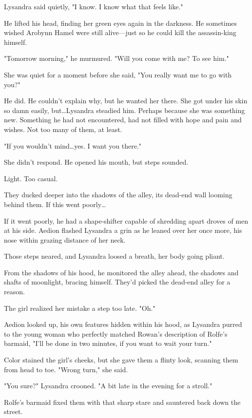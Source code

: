 Lysandra said quietly, "I know.
I know what that feels like."

He lifted his head, finding her green eyes again in the darkness.
He sometimes wished Arobynn Hamel were still alive---just so he could kill the assassin-king himself.

"Tomorrow morning," he murmured.
"Will you come with me?
To see him."

She was quiet for a moment before she said, "You really want me to go with you?"

He did.
He couldn't explain why, but he wanted her there.
She got under his skin so damn easily, but\ldots Lysandra steadied him.
Perhaps because she was something new.
Something he had not encountered, had not filled with hope and pain and wishes.
Not too many of them, at least.

"If you wouldn't mind\ldots yes.
I want you there."

She didn't respond.
He opened his mouth, but steps sounded.

Light.
Too casual.

They ducked deeper into the shadows of the alley, its dead-end wall looming behind them.
If this went poorly\ldots{}

If it went poorly, he had a shape-shifter capable of shredding apart droves of men at his side.
Aedion flashed Lysandra a grin as he leaned over her once more, his nose within grazing distance of her neck.

Those steps neared, and Lysandra loosed a breath, her body going pliant.

From the shadows of his hood, he monitored the alley ahead, the shadows and shafts of moonlight, bracing himself.
They'd picked the dead-end alley for a reason.

The girl realized her mistake a step too late.
"Oh."

Aedion looked up, his own features hidden within his hood, as Lysandra purred to the young woman who perfectly matched Rowan's description of Rolfe's barmaid, "I'll be done in two minutes, if you want to wait your turn."

Color stained the girl's cheeks, but she gave them a flinty look, scanning them from head to toe.
"Wrong turn," she said.

"You sure?"
Lysandra crooned.
"A bit late in the evening for a stroll."

Rolfe's barmaid fixed them with that sharp stare and sauntered back down the street.

